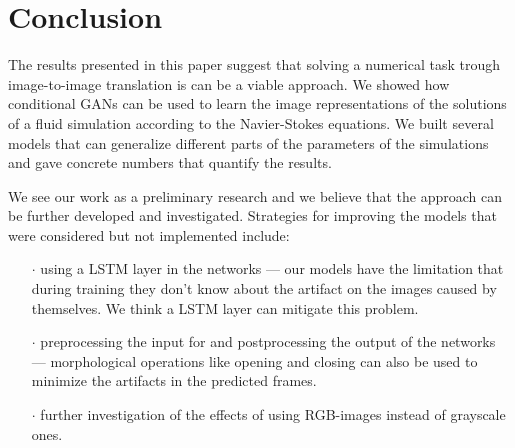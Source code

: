 \documentclass{llncs}
\begin{document}
\section{Conclusion}\label{conclusion}

The results presented in this paper suggest that solving a numerical task trough image-to-image translation is can be a viable approach. We showed how conditional GANs can be used to learn the image representations of the solutions of a fluid simulation according to the Navier-Stokes equations. We built several models that can generalize different parts of the parameters of the simulations and gave concrete numbers that quantify the results.

We see our work as a preliminary research and we believe that the approach can be further developed and investigated. Strategies for improving the models that were considered but not implemented include:
\begin{itemize}
\item[$\cdot$] using a LSTM layer in the networks --- our models have the limitation that during training they don't know about the artifact on the images caused by themselves. We think a LSTM layer can mitigate this problem.
\item[$\cdot$] preprocessing the input for and postprocessing the output of the networks --- morphological operations like opening and closing can also be used to minimize the artifacts in the predicted frames.
\item[$\cdot$] further investigation of the effects of using RGB-images instead of grayscale ones.
\end{itemize}


\clearpage


\end{document}
